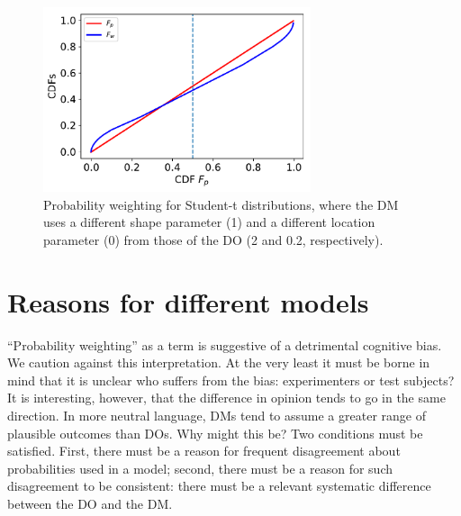 \documentclass[a4paper, 12pt]{article}
\newcommand{\flabel}[1]{\label{fig:#1}}
\newcommand{\seclabel}[1]{\label{sec:#1}}
\newcommand{\ND}{\mathcal{N}} %
\begin{document}
\begin{figure}[htb]
\centering
\includegraphics[width=0.7\textwidth]{./figs/Student-t.pdf}
\caption{Probability weighting for Student-t distributions, where the DM uses a different shape parameter (1) and a different location parameter (0) from those of the DO (2 and 0.2, respectively).}
\flabel{fat_tailed_CDF}
\end{figure}



\FloatBarrier
\section{Reasons for different models\seclabel{Reasons_for}}
``Probability weighting'' as a term is suggestive of a detrimental cognitive bias. We caution against this interpretation. At the very least it must be borne in mind that it is unclear who suffers from the bias: experimenters or test subjects? It is interesting, however, that the difference in opinion tends to go in the same direction. In more neutral language, DMs tend to assume a greater range of plausible outcomes than DOs. Why might this be? Two conditions must be satisfied. First, there must be a reason for frequent disagreement about probabilities used in a model; second, there must be a reason for such disagreement to be consistent: there must be a relevant systematic difference between the DO and the DM. 
\end{document}
